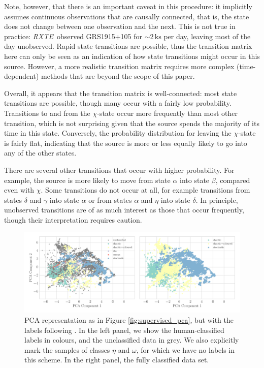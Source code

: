 \documentclass[fleqn,usenatbib]{mnras}
\newcommand{\project}[1]{\textsl{#1}}
\newcommand{\rxte}{\project{RXTE}}
\begin{document}
Note, however, that there is an important caveat in this procedure: it implicitly assumes continuous observations that are causally connected, that is, the state 
does not change between one observation and the next. This is not true in practice: \rxte\ observed GRS1915+105 for $\sim 2\,\mathrm{ks}$ per day, leaving most 
of the day unobserved. Rapid state transitions are possible, thus the transition matrix here can only be seen as an indication of how state transitions might occur 
in this source. However, a more realistic transition matrix requires more complex (time-dependent) methods that are beyond the scope of this paper.

Overall, it appears that the transition matrix is well-connected: most state transitions are possible, though many occur with a fairly low probability.
Transitions to and from the $\chi$-state occur more frequently than most other transition, which is not surprising given that the source spends the majority of its time 
in this state. Conversely, the probability distribution for leaving the $\chi$-state is fairly flat, indicating that the source is more or less equally likely to go into any 
of the other states.  

There are several other transitions that occur with higher probability. For example, the source is more likely to move from state $\alpha$ into state $\beta$, compared even with $\chi$. 
Some transitions do not occur at all, for example transitions from states $\delta$ and $\gamma$ into state $\alpha$ or from states $\alpha$ and $\eta$ into state $\delta$. In principle, unobserved transitions are of as much interest as those that occur frequently, though their interpretation requires caution. 

\begin{figure}
\begin{center}
\includegraphics[width=\textwidth]{grs1915_supervised_phys_features_pca.pdf}
\caption{PCA representation as in Figure \ref{fig:supervised_pca}, but with the labels following \citet{harikrishnan2011}. In the left panel, we show the human-classified labels in colours, and the unclassified data in grey. We also explicitly mark the samples of classes $\eta$ and $\omega$, for which we have no labels in this scheme. In the right panel, the fully classified data set.} 
\label{fig:pca_physical}
\end{center}
\end{figure}
\end{document}
